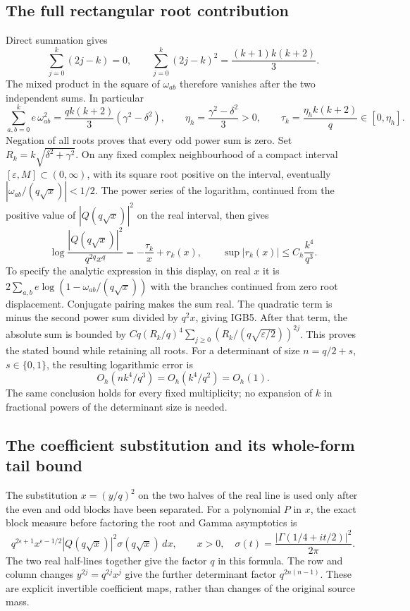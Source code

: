 \subsection{The full rectangular root contribution}

Direct summation gives
\[
 \sum_{j=0}^k(2j-k)=0,\qquad
 \sum_{j=0}^k(2j-k)^2=\frac{(k+1)k(k+2)}3 .
\]
The mixed product in the square of $\omega_{ab}$ therefore vanishes
after the two independent sums. In particular
\[
 \sum_{a,b=0}^k e\,\omega_{ab}^2
   =\frac{qk(k+2)}3(\gamma^2-\delta^2),\qquad
 \eta_h=\frac{\gamma^2-\delta^2}{3}>0,\qquad
 \tau_k=\frac{\eta_h k(k+2)}q\in[0,\eta_h].
 \tag{IGB5}
\]
Negation of all roots proves that every odd power sum is zero.
Set $R_k=k\sqrt{\delta^2+\gamma^2}$. On any fixed complex
neighbourhood of a compact interval $[\varepsilon,M]\subset(0,\infty)$,
with its square root positive on the interval, eventually
$|\omega_{ab}/(q\sqrt{x})|<1/2$. The power series of the logarithm,
continued from the positive value of $|Q(q\sqrt{x})|^2$ on the
real interval, then gives
\[
 \log\frac{|Q(q\sqrt{x})|^2}{q^{2q}x^q}
 =-\frac{\tau_k}{x}+r_k(x),\qquad
 \sup|r_k(x)|\leq C_h\frac{k^4}{q^3}.
 \tag{IGB6}
\]
To specify the analytic expression in this display, on real $x$ it is
$2\sum_{a,b}e\log(1-\omega_{ab}/(q\sqrt{x}))$ with the
branches continued from zero root displacement. Conjugate pairing
makes the sum real. The quadratic term is minus the second power sum
divided by $q^2x$, giving IGB5. After that term, the absolute sum is
bounded by
$Cq(R_k/q)^4\sum_{j\geq0}(R_k/(q\sqrt{\varepsilon/2}))^{2j}$.
This proves the stated bound while retaining all roots.
For a determinant of size $n=q/2+s$, $s\in\{0,1\}$, the resulting
logarithmic error is
\[
 O_h(nk^4/q^3)=O_h(k^4/q^2)=O_h(1).
 \tag{IGB7}
\]
The same conclusion holds for every fixed multiplicity; no expansion
of $k$ in fractional powers of the determinant size is needed.

\subsection{The coefficient substitution and its whole-form tail bound}

The substitution $x=(y/q)^2$ on the two halves of the real line is
used only after the even and odd blocks have been separated.
For a polynomial $P$ in $x$, the exact block measure before factoring
the root and Gamma asymptotics is
\[
 q^{2\epsilon+1}x^{\epsilon-1/2}|Q(q\sqrt{x})|^2
             \sigma(q\sqrt{x})\,dx,\qquad x>0,
 \quad
 \sigma(t)=\frac{|\Gamma(1/4+it/2)|^2}{2\pi}.
 \tag{IGB8}
\]
The two real half-lines together give the factor $q$ in this formula.
The row and column changes $y^{2j}=q^{2j}x^j$ give the further
determinant factor $q^{2n(n-1)}$. These are explicit invertible
coefficient maps, rather than changes of the original source mass.

